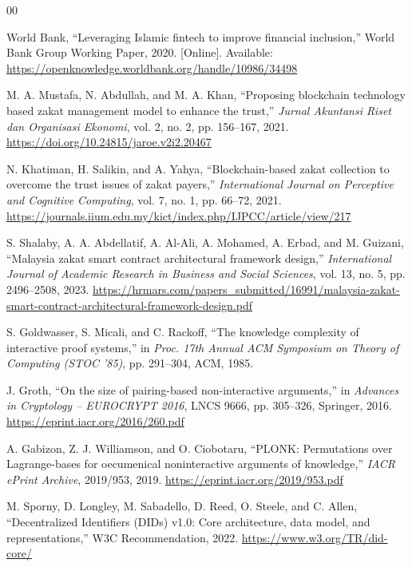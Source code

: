 \documentclass[conference]{IEEEtran}
\begin{document}
\begin{thebibliography}{00}

World Bank, ``Leveraging Islamic fintech to improve financial inclusion,'' World Bank Group Working Paper, 2020. [Online]. Available: \url{https://openknowledge.worldbank.org/handle/10986/34498}

M. A. Mustafa, N. Abdullah, and M. A. Khan, ``Proposing blockchain technology based zakat management model to enhance the trust,'' \textit{Jurnal Akuntansi Riset dan Organisasi Ekonomi}, vol. 2, no. 2, pp. 156--167, 2021. \url{https://doi.org/10.24815/jaroe.v2i2.20467}

N. Khatiman, H. Salikin, and A. Yahya, ``Blockchain-based zakat collection to overcome the trust issues of zakat payers,'' \textit{International Journal on Perceptive and Cognitive Computing}, vol. 7, no. 1, pp. 66--72, 2021. \url{https://journals.iium.edu.my/kict/index.php/IJPCC/article/view/217}

S. Shalaby, A. A. Abdellatif, A. Al-Ali, A. Mohamed, A. Erbad, and M. Guizani, ``Malaysia zakat smart contract architectural framework design,'' \textit{International Journal of Academic Research in Business and Social Sciences}, vol. 13, no. 5, pp. 2496--2508, 2023. \url{https://hrmars.com/papers_submitted/16991/malaysia-zakat-smart-contract-architectural-framework-design.pdf}

S. Goldwasser, S. Micali, and C. Rackoff, ``The knowledge complexity of interactive proof systems,'' in \textit{Proc. 17th Annual ACM Symposium on Theory of Computing (STOC '85)}, pp. 291--304, ACM, 1985.

J. Groth, ``On the size of pairing-based non-interactive arguments,'' in \textit{Advances in Cryptology -- EUROCRYPT 2016}, LNCS 9666, pp. 305--326, Springer, 2016. \url{https://eprint.iacr.org/2016/260.pdf}

A. Gabizon, Z. J. Williamson, and O. Ciobotaru, ``PLONK: Permutations over Lagrange-bases for oecumenical noninteractive arguments of knowledge,'' \textit{IACR ePrint Archive}, 2019/953, 2019. \url{https://eprint.iacr.org/2019/953.pdf}

M. Sporny, D. Longley, M. Sabadello, D. Reed, O. Steele, and C. Allen, ``Decentralized Identifiers (DIDs) v1.0: Core architecture, data model, and representations,'' W3C Recommendation, 2022. \url{https://www.w3.org/TR/did-core/}


\end{thebibliography}
\end{document}
